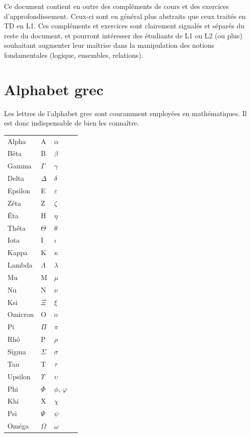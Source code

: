 \documentclass[11pt,a4paper]{book}
\theoremstyle{definition}
\theoremstyle{plain}
\begin{document}
Ce document contient en outre des compléments de cours et des exercices d'approfondissement. Ceux-ci  sont en général plus abstraits que ceux traités en TD en L1. Ces compléments et exercices sont clairement signalés et séparés du reste du document, et pourront intéresser des étudiants de L1 ou L2 (ou plus) souhaitant augmenter leur maîtrise dans la manipulation des notions fondamentales (logique, ensembles, relations).

\newpage
\section{Alphabet grec}

\noindent Les lettres de l'alphabet grec sont couramment employées en mathématiques. Il est donc indispensable de bien les connaître.

\begin{center}

\def\arraystretch{1.2}
\setlength\tabcolsep{20pt}
\begin{tabular}{llll}
Alpha		& A 			& $\alpha$\\
Bêta			& B 			& $\beta$\\
Gamma		& $\Gamma$ 	& $\gamma$\\
Delta		& $\Delta$ 	& $\delta$\\
Epsilon		& E 			& $\varepsilon$\\
Zêta			& Z 			& $\zeta$\\
Êta			& H 			& $\eta$\\
Thêta		& $\Theta$ 	& $\theta$\\
Iota			& I 			& $\iota$\\
Kappa		& K 			& $\kappa$\\
Lambda		& $\Lambda$ 	& $\lambda$\\
Mu			& M 			& $\mu$\\
Nu			& N 			& $\nu$\\
Ksi			& $\Xi$ 		& $\xi$\\
Omicron		& O 			& o\\
Pi			& $\Pi$ 		& $\pi$\\
Rhô			& P 			& $\rho$\\
Sigma		& $\Sigma$ 	& $\sigma$\\
Tau			& T 			& $\tau$\\
Upsilon		& $\Upsilon$& $\upsilon$\\
Phi			& $\Phi$ 	& $\phi$, $\varphi$\\
Khi			& X 			& $\chi$\\
Psi			& $\Psi$ 	& $\psi$ \\
Oméga		& $\Omega$ 	& $\omega$\\
\end{tabular}
\end{center}













\printindex
\end{document}
